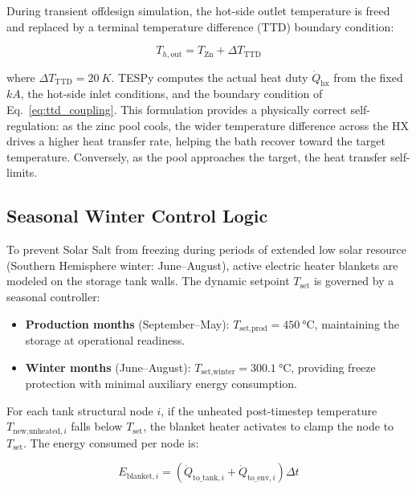 \documentclass[11pt,review,3p]{elsarticle}
\begin{document}
During transient offdesign simulation, the hot-side outlet temperature is freed and replaced by a terminal temperature difference (TTD) boundary condition:

\begin{equation}
    T_{h,\text{out}} = T_{\text{Zn}} + \Delta T_{\text{TTD}}
    \label{eq:ttd_coupling}
\end{equation}

where $\Delta T_{\text{TTD}} = \SI{20}{K}$. TESPy computes the actual heat duty $\dot{Q}_{\text{hx}}$ from the fixed $kA$, the hot-side inlet conditions, and the boundary condition of Eq.~\eqref{eq:ttd_coupling}. This formulation provides a physically correct self-regulation: as the zinc pool cools, the wider temperature difference across the HX drives a higher heat transfer rate, helping the bath recover toward the target temperature. Conversely, as the pool approaches the target, the heat transfer self-limits.

\subsection{Seasonal Winter Control Logic}
\label{sec:winter_logic}

To prevent Solar Salt from freezing during periods of extended low solar resource (Southern Hemisphere winter: June--August), active electric heater blankets are modeled on the storage tank walls. The dynamic setpoint $T_{\text{set}}$ is governed by a seasonal controller:

\begin{itemize}[leftmargin=*, itemsep=2pt]
    \item \textbf{Production months} (September--May): $T_{\text{set,prod}} = \SI{450}{\celsius}$, maintaining the storage at operational readiness.
    \item \textbf{Winter months} (June--August): $T_{\text{set,winter}} = \SI{300.1}{\celsius}$, providing freeze protection with minimal auxiliary energy consumption.
\end{itemize}

For each tank structural node $i$, if the unheated post-timestep temperature $T_{\text{new,unheated},i}$ falls below $T_{\text{set}}$, the blanket heater activates to clamp the node to $T_{\text{set}}$. The energy consumed per node is:

\begin{equation}
    E_{\text{blanket},i} = \left( \dot{Q}_{\text{to\_tank},i} + \dot{Q}_{\text{to\_env},i} \right) \Delta t
    \label{eq:blanket}
\end{equation}
\end{document}
